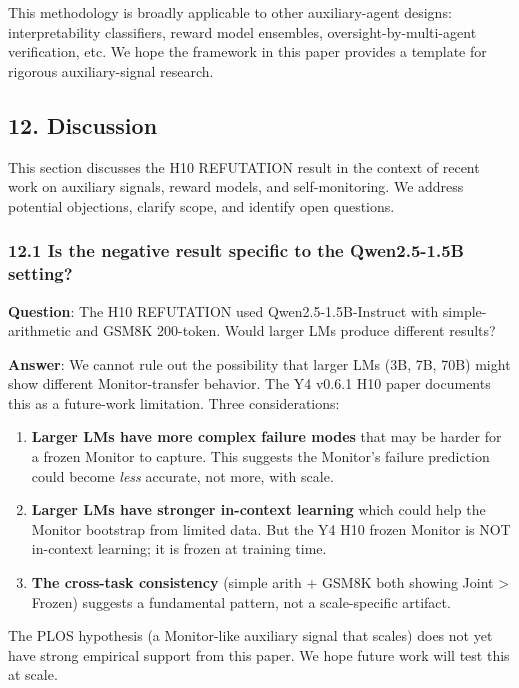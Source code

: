 \documentclass[
]{article}
\begin{document}
This methodology is broadly applicable to other auxiliary-agent designs:
interpretability classifiers, reward model ensembles,
oversight-by-multi-agent verification, etc. We hope the framework in
this paper provides a template for rigorous auxiliary-signal research.

\subsection{12. Discussion}\label{discussion}

This section discusses the H10 REFUTATION result in the context of
recent work on auxiliary signals, reward models, and self-monitoring. We
address potential objections, clarify scope, and identify open
questions.

\subsubsection{12.1 Is the negative result specific to the Qwen2.5-1.5B
setting?}\label{is-the-negative-result-specific-to-the-qwen2.5-1.5b-setting}

\textbf{Question}: The H10 REFUTATION used Qwen2.5-1.5B-Instruct with
simple- arithmetic and GSM8K 200-token. Would larger LMs produce
different results?

\textbf{Answer}: We cannot rule out the possibility that larger LMs (3B,
7B, 70B) might show different Monitor-transfer behavior. The Y4 v0.6.1
H10 paper documents this as a future-work limitation. Three
considerations:

\begin{enumerate}
\def\labelenumi{\arabic{enumi}.}
\item
  \textbf{Larger LMs have more complex failure modes} that may be harder
  for a frozen Monitor to capture. This suggests the Monitor's failure
  prediction could become \emph{less} accurate, not more, with scale.
\item
  \textbf{Larger LMs have stronger in-context learning} which could help
  the Monitor bootstrap from limited data. But the Y4 H10 frozen Monitor
  is NOT in-context learning; it is frozen at training time.
\item
  \textbf{The cross-task consistency} (simple arith + GSM8K both showing
  Joint \textgreater{} Frozen) suggests a fundamental pattern, not a
  scale-specific artifact.
\end{enumerate}

The PLOS hypothesis (a Monitor-like auxiliary signal that scales) does
not yet have strong empirical support from this paper. We hope future
work will test this at scale.
\end{document}
